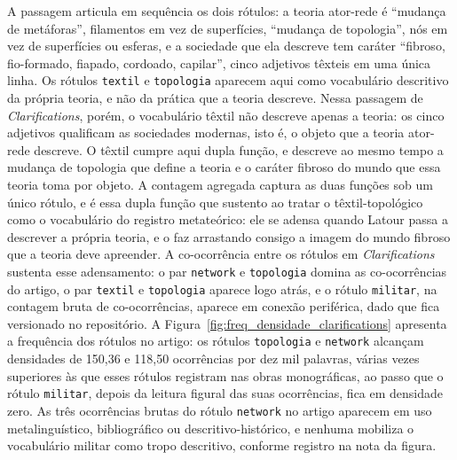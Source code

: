 A passagem articula em sequência os dois rótulos: a teoria ator-rede é \enquote{mudança de metáforas}, filamentos em vez de superfícies, \enquote{mudança de topologia}, nós em vez de superfícies ou esferas, e a sociedade que ela descreve tem caráter \enquote{fibroso, fio-formado, fiapado, cordoado, capilar}, cinco adjetivos têxteis em uma única linha. Os rótulos \texttt{textil} e \texttt{topologia} aparecem aqui como vocabulário descritivo da própria teoria, e não da prática que a teoria descreve. Nessa passagem de \emph{Clarifications}, porém, o vocabulário têxtil não descreve apenas a teoria: os cinco adjetivos qualificam as sociedades modernas, isto é, o objeto que a teoria ator-rede descreve. O têxtil cumpre aqui dupla função, e descreve ao mesmo tempo a mudança de topologia que define a teoria e o caráter fibroso do mundo que essa teoria toma por objeto. A contagem agregada captura as duas funções sob um único rótulo, e é essa dupla função que sustento ao tratar o têxtil-topológico como o vocabulário do registro metateórico: ele se adensa quando Latour passa a descrever a própria teoria, e o faz arrastando consigo a imagem do mundo fibroso que a teoria deve apreender. A co-ocorrência entre os rótulos em \emph{Clarifications} sustenta esse adensamento: o par \texttt{network} e \texttt{topologia} domina as co-ocorrências do artigo, o par \texttt{textil} e \texttt{topologia} aparece logo atrás, e o rótulo \texttt{militar}, na contagem bruta de co-ocorrências, aparece em conexão periférica, dado que fica versionado no repositório. A Figura~\ref{fig:freq_densidade_clarifications} apresenta a frequência dos rótulos no artigo: os rótulos \texttt{topologia} e \texttt{network} alcançam densidades de 150,36 e 118,50 ocorrências por dez mil palavras, várias vezes superiores às que esses rótulos registram nas obras monográficas, ao passo que o rótulo \texttt{militar}, depois da leitura figural das suas ocorrências, fica em densidade zero. As três ocorrências brutas do rótulo \texttt{network} no artigo aparecem em uso metalinguístico, bibliográfico ou descritivo-histórico, e nenhuma mobiliza o vocabulário militar como tropo descritivo, conforme registro na nota da figura.

